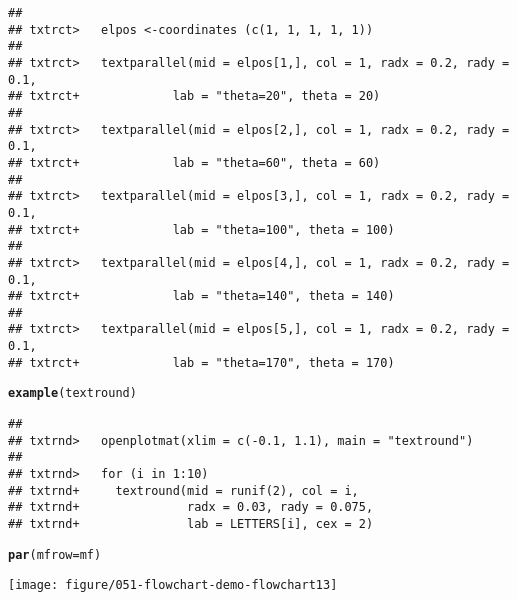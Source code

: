 \documentclass{article}\usepackage[]{graphicx}\usepackage[]{color}
\makeatletter
\def\maxwidth{ %
  \ifdim\Gin@nat@width>\linewidth
    \linewidth
  \else
    \Gin@nat@width
  \fi
}
\newcommand{\hlstd}[1]{\textcolor[rgb]{0.345,0.345,0.345}{#1}}%
\newcommand{\hlkwc}[1]{\textcolor[rgb]{0.333,0.667,0.333}{#1}}%
\newcommand{\hlkwd}[1]{\textcolor[rgb]{0.737,0.353,0.396}{\textbf{#1}}}%
\newenvironment{kframe}{%
 \def\at@end@of@kframe{}%
 \ifinner\ifhmode%
  \def\at@end@of@kframe{\end{minipage}}%
  \begin{minipage}{\columnwidth}%
 \fi\fi%
 \def\FrameCommand##1{\hskip\@totalleftmargin \hskip-\fboxsep
 \colorbox{shadecolor}{##1}\hskip-\fboxsep
     \hskip-\linewidth \hskip-\@totalleftmargin \hskip\columnwidth}%
 \MakeFramed {\advance\hsize-\width
   \@totalleftmargin\z@ \linewidth\hsize
   \@setminipage}}%
 {\par\unskip\endMakeFramed%
 \at@end@of@kframe}
\newenvironment{knitrout}{}{} %
\makeatother
\begin{document}
\begin{knitrout}
\begin{kframe}\begin{verbatim}
## 
## txtrct>   elpos <-coordinates (c(1, 1, 1, 1, 1))
## 
## txtrct>   textparallel(mid = elpos[1,], col = 1, radx = 0.2, rady = 0.1,
## txtrct+             lab = "theta=20", theta = 20)
## 
## txtrct>   textparallel(mid = elpos[2,], col = 1, radx = 0.2, rady = 0.1,
## txtrct+             lab = "theta=60", theta = 60)
## 
## txtrct>   textparallel(mid = elpos[3,], col = 1, radx = 0.2, rady = 0.1,
## txtrct+             lab = "theta=100", theta = 100)
## 
## txtrct>   textparallel(mid = elpos[4,], col = 1, radx = 0.2, rady = 0.1,
## txtrct+             lab = "theta=140", theta = 140)
## 
## txtrct>   textparallel(mid = elpos[5,], col = 1, radx = 0.2, rady = 0.1,
## txtrct+             lab = "theta=170", theta = 170)
\end{verbatim}
\begin{alltt}
\hlkwd{example}\hlstd{(textround)}
\end{alltt}
\begin{verbatim}
## 
## txtrnd>   openplotmat(xlim = c(-0.1, 1.1), main = "textround")
## 
## txtrnd>   for (i in 1:10) 
## txtrnd+     textround(mid = runif(2), col = i, 
## txtrnd+               radx = 0.03, rady = 0.075,
## txtrnd+               lab = LETTERS[i], cex = 2)
\end{verbatim}
\begin{alltt}
\hlkwd{par}\hlstd{(}\hlkwc{mfrow} \hlstd{= mf)}
\end{alltt}
\end{kframe}
\texttt{[image: figure/051-flowchart-demo-flowchart13]} 

\end{knitrout}
\end{document}
